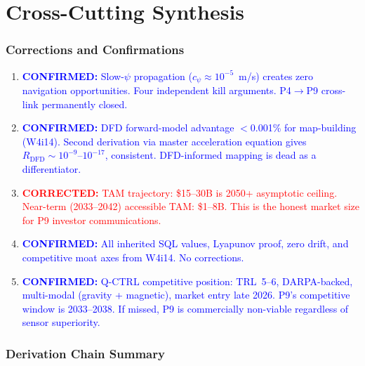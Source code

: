 \documentclass[11pt]{article}
\theoremstyle{definition}
\theoremstyle{remark}
\newcommand{\confirmed}[1]{\textcolor{blue}{\textbf{CONFIRMED:} #1}}
\newcommand{\corrected}[1]{\textcolor{red}{\textbf{CORRECTED:} #1}}
\begin{document}
\part{Cross-Cutting Synthesis}
\label{part:synthesis}

\section{Corrections and Confirmations}
\label{sec:corrections}

\begin{enumerate}
\item \confirmed{Slow-$\psi$ propagation ($c_\psi \approx 10^{-5}$~m/s)
  creates zero navigation opportunities. Four independent kill arguments.
  P4$\to$P9 cross-link permanently closed.}

\item \confirmed{DFD forward-model advantage $<$0.001\% for map-building
  (W4i14). Second derivation via master acceleration equation gives
  $R_{\mathrm{DFD}} \sim 10^{-9}$--$10^{-17}$, consistent.
  DFD-informed mapping is dead as a differentiator.}

\item \corrected{TAM trajectory: \$15--30B is 2050+ asymptotic ceiling.
  Near-term (2033--2042) accessible TAM: \$1--8B. This is the honest
  market size for P9 investor communications.}

\item \confirmed{All inherited SQL values, Lyapunov proof, zero drift,
  and competitive moat axes from W4i14. No corrections.}

\item \confirmed{Q-CTRL competitive position: TRL~5--6, DARPA-backed,
  multi-modal (gravity + magnetic), market entry late 2026. P9's
  competitive window is 2033--2038. If missed, P9 is commercially
  non-viable regardless of sensor superiority.}
\end{enumerate}

\section{Derivation Chain Summary}
\label{sec:derivation-chains}
\end{document}
